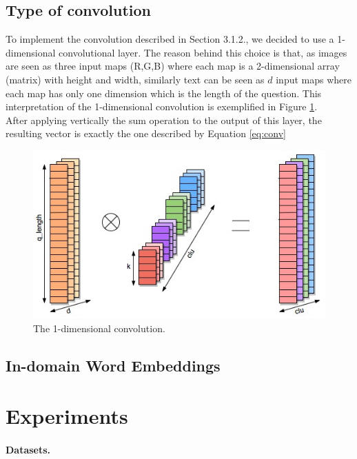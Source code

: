 \documentclass[10pt,twocolumn,letterpaper]{article}
\begin{document}
\subsection{Type of convolution}
To implement the convolution described in Section 3.1.2., we decided to use a 1-dimensional convolutional layer. The reason behind this choice is that, as images are seen as three input maps (R,G,B) where each map is a 2-dimensional array (matrix) with height and width, similarly text can be seen as $d$ input maps where each map has only one dimension which is the length of the question. This interpretation of the 1-dimensional convolution is exemplified in Figure \ref{fig:conv}.\\
After applying vertically the sum operation to the output of this layer, the resulting vector is exactly the one described by Equation \ref{eq:conv}    

\begin{figure}[t]
\begin{center}
\includegraphics[width=0.8\linewidth]{img/conv1d.jpg}
\end{center}
\caption{The 1-dimensional convolution.}
\label{fig:conv}
\end{figure}
\subsection{In-domain Word Embeddings}    

\section{Experiments}


\paragraph{Datasets.}
 
\end{document}
